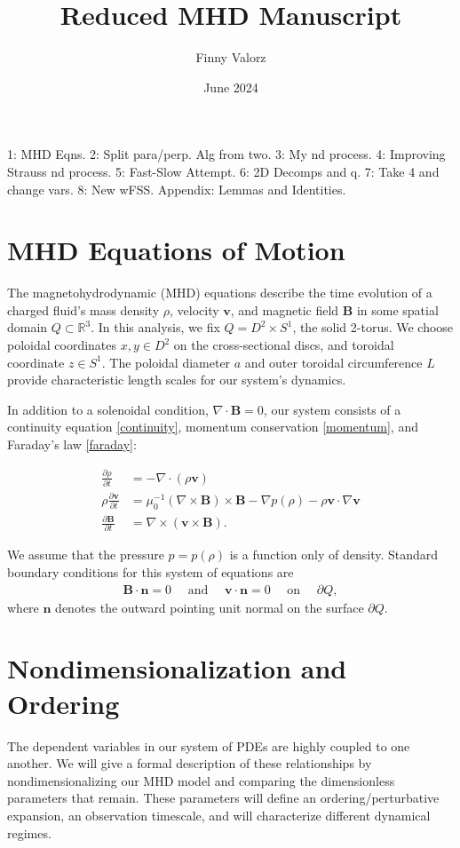 \documentclass{article}
\title{Reduced MHD Manuscript}
\author{Finny Valorz}
\date{June 2024}
\newcommand{\p}{\partial}
\newcommand{\deriv}[2]{\frac{\p #1}{\p #2}}
\newcommand{\pth} [1] {\left( #1 \right) }
\begin{document}
\maketitle



1: MHD Eqns. 2: Split para/perp. Alg from two. 3: My nd process. 4: Improving Strauss nd process. 5: Fast-Slow Attempt. 6: 2D Decomps and q. 7: Take 4 and change vars. 8: New wFSS. Appendix: Lemmas and Identities. 

\section{MHD Equations of Motion} 
The magnetohydrodynamic (MHD) equations describe the time evolution of a charged fluid's mass density $\rho$, velocity $\bm{v}$, and magnetic field $\bm{B}$ in some spatial domain $Q\subset \mathbb{R}^3$. In this analysis, we fix $Q=D^2\times S^1$, the solid 2-torus. We choose poloidal coordinates $x,y\in D^2$ on the cross-sectional discs, and toroidal coordinate $z \in S^1$. The poloidal diameter $a$ and outer toroidal circumference $L$ provide characteristic length scales for our system's dynamics. 

In addition to a solenoidal condition, $\nabla\cdot \bm{B}=0$, our system consists of a continuity equation \eqref{continuity}, momentum conservation \eqref{momentum}, and Faraday's law \eqref{faraday}:

\begin{align}
    \deriv{\rho}{t} &= -\nabla\cdot \pth{\rho \bm{v}} \label{continuity} \\ 
    \rho\deriv{\bm{v}}{t} &= \mu_0^{-1} \pth{\nabla\times \bm{B}} \times \bm{B} - \nabla p(\rho) - \rho \bm{v}\cdot\nabla \bm{v} \label{momentum} \\ 
    \deriv{\bm{B}}{t} &= \nabla \times \pth{\bm{v}\times \bm{B}}. \label{faraday}
\end{align}

We assume that the pressure $p=p(\rho)$ is a function only of density. Standard boundary conditions for this system of equations are
\begin{align*} 
    \bm{B}\cdot \bm{n} = 0 \quad \text{ and }\quad  \bm{v}\cdot \bm{n} = 0 \quad \text{ on }\quad \p Q,
\end{align*}
where $\bm{n}$ denotes the outward pointing unit normal on the surface $\p Q$. 



\section{Nondimensionalization and Ordering} 
The dependent variables in our system of PDEs are highly coupled to one another. We will give a formal description of these relationships by nondimensionalizing our MHD model and comparing the dimensionless parameters that remain. These parameters will define an ordering/perturbative expansion, an observation timescale, and will characterize different dynamical regimes. 
\end{document}
